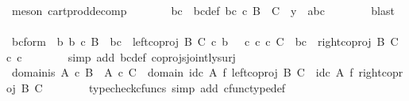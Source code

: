 \begin{isabellebody}
\ {\isacharparenleft}{\kern0pt}meson\ cart{\isacharunderscore}{\kern0pt}prod{\isacharunderscore}{\kern0pt}decomp{\isacharparenright}{\kern0pt}\isanewline
\ \ \ \ \isamarkupfalse%
\ \isamarkupfalse%
\ bc\ \ bc{\isacharunderscore}{\kern0pt}def{\isacharcolon}{\kern0pt}\ {\isachardoublequoteopen}bc\ {\isasymin}\isactrlsub c\ {\isacharparenleft}{\kern0pt}B\ {\isasymCoprod}\ C{\isacharparenright}{\kern0pt}\ {\isasymand}\ y\ {\isacharequal}{\kern0pt}\ {\isasymlangle}a{\isacharcomma}{\kern0pt}bc{\isasymrangle}{\isachardoublequoteclose}\isanewline
\ \ \ \ \ \ \isamarkupfalse%
\ blast\isanewline
\ \ \ \ \isamarkupfalse%
\ bc{\isacharunderscore}{\kern0pt}form{\isacharcolon}{\kern0pt}\ {\isachardoublequoteopen}{\isacharparenleft}{\kern0pt}{\isasymexists}\ b{\isachardot}{\kern0pt}\ b\ {\isasymin}\isactrlsub c\ B\ {\isasymand}\ bc\ {\isacharequal}{\kern0pt}\ left{\isacharunderscore}{\kern0pt}coproj\ B\ C\ {\isasymcirc}\isactrlsub c\ b{\isacharparenright}{\kern0pt}\ {\isasymor}\ {\isacharparenleft}{\kern0pt}{\isasymexists}\ c{\isachardot}{\kern0pt}\ c\ {\isasymin}\isactrlsub c\ C\ {\isasymand}\ bc\ {\isacharequal}{\kern0pt}\ right{\isacharunderscore}{\kern0pt}coproj\ B\ C\ {\isasymcirc}\isactrlsub c\ c{\isacharparenright}{\kern0pt}{\isachardoublequoteclose}\isanewline
\ \ \ \ \ \ \isamarkupfalse%
\ {\isacharparenleft}{\kern0pt}simp\ add{\isacharcolon}{\kern0pt}\ bc{\isacharunderscore}{\kern0pt}def\ coprojs{\isacharunderscore}{\kern0pt}jointly{\isacharunderscore}{\kern0pt}surj{\isacharparenright}{\kern0pt}\isanewline
\ \ \ \ \isamarkupfalse%
\ domain{\isacharunderscore}{\kern0pt}is{\isacharcolon}{\kern0pt}\ {\isachardoublequoteopen}{\isacharparenleft}{\kern0pt}A\ {\isasymtimes}\isactrlsub c\ B{\isacharparenright}{\kern0pt}\ {\isasymCoprod}\ {\isacharparenleft}{\kern0pt}A\ {\isasymtimes}\isactrlsub c\ C{\isacharparenright}{\kern0pt}\ {\isacharequal}{\kern0pt}\ domain\ {\isacharparenleft}{\kern0pt}{\isacharparenleft}{\kern0pt}id\isactrlsub c\ A\ {\isasymtimes}\isactrlsub f\ left{\isacharunderscore}{\kern0pt}coproj\ B\ C{\isacharparenright}{\kern0pt}\ {\isasymamalg}\ {\isacharparenleft}{\kern0pt}id\isactrlsub c\ A\ {\isasymtimes}\isactrlsub f\ right{\isacharunderscore}{\kern0pt}coproj\ B\ C{\isacharparenright}{\kern0pt}{\isacharparenright}{\kern0pt}{\isachardoublequoteclose}\isanewline
\ \ \ \ \ \ \isamarkupfalse%
\ {\isacharparenleft}{\kern0pt}typecheck{\isacharunderscore}{\kern0pt}cfuncs{\isacharcomma}{\kern0pt}\ simp\ add{\isacharcolon}{\kern0pt}\ cfunc{\isacharunderscore}{\kern0pt}type{\isacharunderscore}{\kern0pt}def{\isacharparenright}{\kern0pt}\isanewline

\end{isabellebody}
